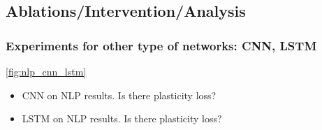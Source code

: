 \subsection{Ablations/Intervention/Analysis}

\subsubsection{Experiments for other type of networks: CNN, LSTM}
\autoref{fig:nlp_cnn_lstm}
\begin{itemize}
    \item CNN on NLP results. Is there plasticity loss? 
    \item LSTM on NLP results. Is there plasticity loss? 
\end{itemize}

\begin{figure}[htb!]
    \centering
    \\
\end{figure}
